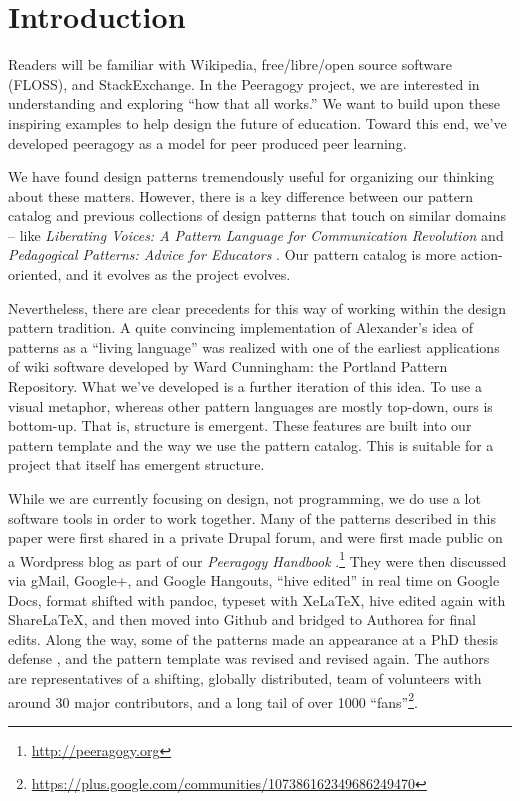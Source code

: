 \section{Introduction}\label{sec:Introduction}

Readers will be familiar with Wikipedia, free/libre/open source software (FLOSS), and StackExchange.  In the Peeragogy project, we are interested in understanding and exploring ``how that all works.''    We want to build upon these inspiring examples to help design the future of education.  Toward this end, we've developed peeragogy as a model for peer produced peer learning.

We have found design patterns tremendously useful for organizing our thinking about these matters.  However, there is a key difference between our pattern catalog and previous collections of design patterns that touch on similar domains -- like \emph{Liberating Voices: A Pattern Language for Communication Revolution} \cite{schuler2008liberating} and \emph{Pedagogical Patterns: Advice for Educators} \cite{bergin2012pedagogical}.  Our pattern catalog is more action-oriented, and it evolves as the project evolves.   

Nevertheless, there are clear precedents for this way of working within the design pattern tradition.  A quite convincing implementation of Alexander’s idea of patterns as a ``living language'' \cite[p.~xvii]{alexander1977pattern} was realized with one of the earliest applications of wiki software developed by Ward Cunningham: the Portland Pattern Repository. What we've developed is a further iteration of this idea. To use a visual metaphor, whereas other pattern languages are mostly top-down, ours is bottom-up.  That is, structure is emergent.  These features are built into our pattern template and the way we use the pattern catalog. This is suitable for a project that itself has emergent structure.

While we are currently focusing on design, not programming, we do use a lot software tools in order to work together.  Many of the patterns described in this paper were first shared in a private Drupal forum, and were first made public on a Wordpress blog as part of our \emph{Peeragogy Handbook} \cite{peeragogy-handbook}.\footnote{\url{http://peeragogy.org}}  They were then discussed via gMail, Google+, and Google Hangouts, ``hive edited'' in real time on Google Docs, format shifted with pandoc, typeset with XeLaTeX, hive edited again with ShareLaTeX, and then moved into Github and bridged to Authorea for final edits.  Along the way, some of the patterns made an appearance at a PhD thesis defense \cite{corneli-thesis}, and the pattern template was revised and revised again.  The authors are representatives of a shifting, globally distributed, team of volunteers with around 30 major contributors, and a long tail of over 1000 ``fans''\footnote{\url{https://plus.google.com/communities/107386162349686249470}}.  


